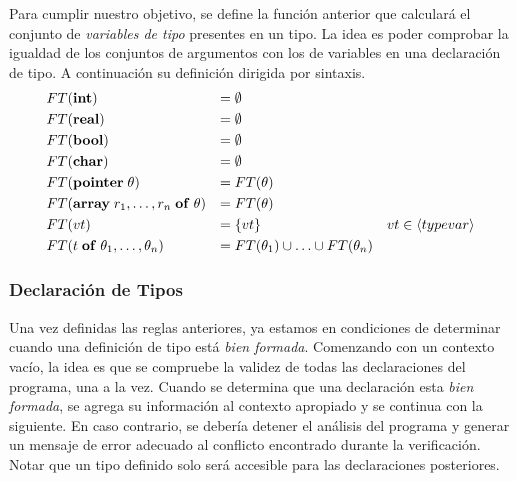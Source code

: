 \documentclass{article}
\begin{document}
Para cumplir nuestro objetivo, se define la función anterior que calculará el conjunto de \textit{variables de tipo} presentes en un tipo.
La idea es poder comprobar la igualdad de los conjuntos de argumentos con los de variables en una declaración de tipo.
A continuación su definición dirigida por sintaxis.
\begin{align*}
&\FT{\T{int}}
&=&\;
\emptyset
\\
&\FT{\T{real}}
&=&\;
\emptyset
\\
&\FT{\T{bool}}
&=&\;
\emptyset
\\
&\FT{\T{char}}
&=&\;
\emptyset
\\
&\FT{\T{pointer} \; \theta}
&=&\;
\FT{\theta}
\\
&\FT{\T{array} \; r_1, \ldots, r_n \; \T{of} \; \theta}
&=&\;
\FT{\theta}
\\
&\FT{vt}
&=&\;
\{ vt \}
&vt \in \NT{typevar}
\\
&\FT{t \; \T{of} \; \theta_1, \ldots, \theta_n}
&=&\;
\FT{\theta_1} \cup \ldots \cup \FT{\theta_n}
\end{align*}

\subsubsection{Declaración de Tipos}

Una vez definidas las reglas anteriores, ya estamos en condiciones de determinar cuando una definición de tipo está \textit{bien formada}.
Comenzando con un contexto vacío, la idea es que se compruebe la validez de todas las declaraciones del programa, una a la vez.
Cuando se determina que una declaración esta \textit{bien formada}, se agrega su información al contexto apropiado y se continua con la siguiente.
En caso contrario, se debería detener el análisis del programa y generar un mensaje de error adecuado al conflicto encontrado durante la verificación.
Notar que un tipo definido solo será accesible para las declaraciones posteriores.

\begin{prooftree}
\end{prooftree}

\begin{prooftree}
\end{prooftree}
\end{document}
